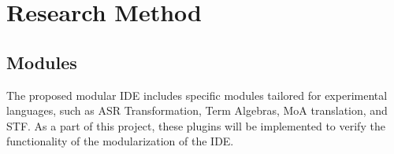 \chapter{Research Method}

\section{Modules}

The proposed modular IDE includes specific modules tailored for experimental
languages, such as ASR Transformation, Term Algebras, MoA translation, and STF.
As a part of this project, these plugins will be implemented to verify the
functionality of the modularization of the IDE.
